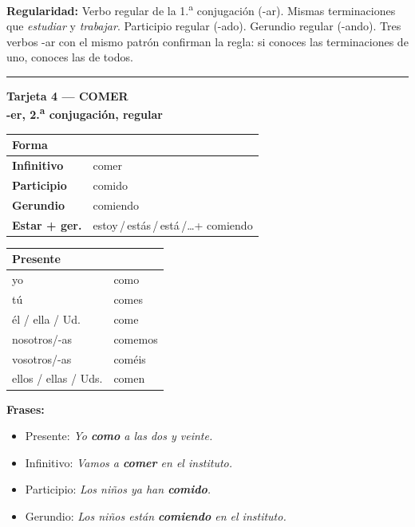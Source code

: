 \documentclass[a4paper,10pt]{article}
\newcommand{\verboheader}[3]{%
  \noindent
  \colorbox{azulverbo!90}{\parbox{\dimexpr\linewidth-2\fboxsep}{%
    \centering\color{white}\bfseries\large Tarjeta #1 --- #2\\[2pt]
    \normalsize #3%
  }}
  \vspace{4pt}
}
\newcommand{\tarjetasep}{%
  \vspace{6pt}
  \noindent\rule{\linewidth}{0.4pt}
  \vspace{6pt}
}
\begin{document}
\begin{trucoverbo}
\textbf{Regularidad:} Verbo regular de la 1.\textsuperscript{a} conjugación (-ar). Mismas terminaciones que \textit{estudiar} y \textit{trabajar}. Participio regular (-ado). Gerundio regular (-ando). Tres verbos -ar con el mismo patrón confirman la regla: si conoces las terminaciones de uno, conoces las de todos.
\end{trucoverbo}

\tarjetasep

\verboheader{4}{COMER}{-er, 2.\textsuperscript{a} conjugación, regular}

\begin{minipage}[t]{0.48\linewidth}
\small
\begin{tabular}{|>{\bfseries}l|l|}
\hline
\rowcolor{azulverbo!15} Forma & \\
\hline
Infinitivo & comer \\
\hline
\rowcolor{grisclaro}
Participio & comido \\
\hline
Gerundio & comiendo \\
\hline
\rowcolor{grisclaro}
Estar + ger. & estoy\,/\,estás\,/\,está\,/\ldots\;+ comiendo \\
\hline
\end{tabular}
\end{minipage}
\hfill
\begin{minipage}[t]{0.48\linewidth}
\small
\begin{tabular}{|l|l|}
\hline
\rowcolor{azulverbo!15} \textbf{Presente} & \\
\hline
yo & como \\
\hline
\rowcolor{grisclaro}
tú & comes \\
\hline
él / ella / Ud. & come \\
\hline
\rowcolor{grisclaro}
nosotros/-as & comemos \\
\hline
vosotros/-as & coméis \\
\hline
\rowcolor{grisclaro}
ellos / ellas / Uds. & comen \\
\hline
\end{tabular}
\end{minipage}

\vspace{4pt}
\small
\textbf{Frases:}
\begin{itemize}[nosep, leftmargin=1em]
\item Presente: \textit{Yo \textbf{como} a las dos y veinte.}
\item Infinitivo: \textit{Vamos a \textbf{comer} en el instituto.}
\item Participio: \textit{Los niños ya han \textbf{comido}.}
\item Gerundio: \textit{Los niños están \textbf{comiendo} en el instituto.}
\end{itemize}
\end{document}
